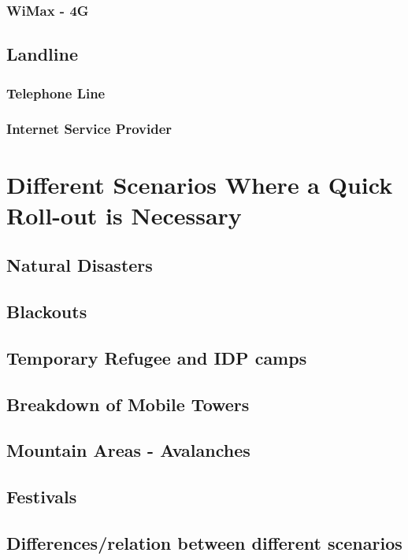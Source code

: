 \subsubsection{WiMax - 4G}

\subsection{Landline}
\subsubsection{Telephone Line}
\subsubsection{Internet Service Provider}

\section{Different Scenarios Where a Quick Roll-out is Necessary}

\subsection{Natural Disasters}

\subsection{Blackouts}

\subsection{Temporary Refugee and IDP camps}

\subsection{Breakdown of Mobile Towers}

\subsection{Mountain Areas - Avalanches}

\subsection{Festivals}

\subsection{Differences/relation between different scenarios}




